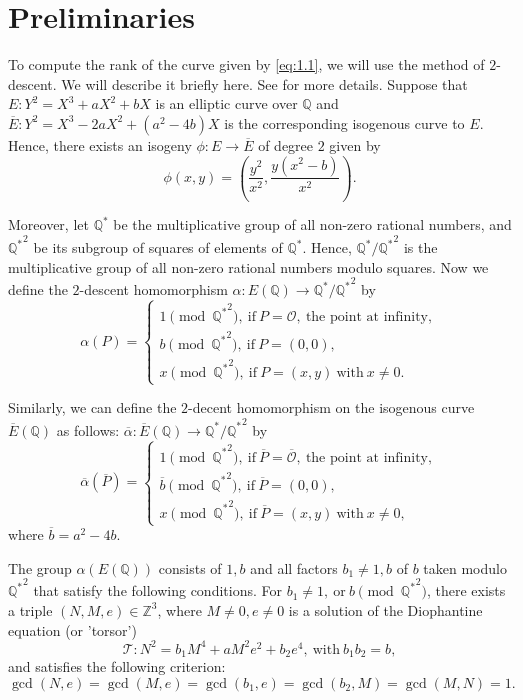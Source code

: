 \documentclass[12pt]{amsart}
\newcommand{\bbQ}{\mathbb{Q}}
\newcommand{\bbZ}{\mathbb{Z}}
\newcommand{\cO}{\mathcal{O}}
\newcommand{\cT}{\mathcal{T}}
\numberwithin{equation}{section}
\theoremstyle{definition}
\begin{document}
\section{Preliminaries}

To compute the rank of the curve given by \eqref{eq:1.1}, we will use the method
of $2$-descent. We will describe it briefly here. See \cite[Chapter~III, Sections~4--6]{ST15}
for more details. Suppose that $E: Y^{2}= X^{3} + aX^{2} + bX$ is an elliptic curve
over $\bbQ$ and $\overline{E}: Y^{2} = X^{3} - 2aX^{2} + \left( a^{2}- 4b \right)X$
is the corresponding isogenous curve to $E$. Hence, there exists an isogeny
$\phi: E \rightarrow \overline{E}$ of degree $2$ given by
\[
\phi(x,y) = \left( \frac{y^{2}}{x^{2}}, \frac{y(x^{2}-b)}{x^{2}} \right).
\]

Moreover, let $\bbQ^{*}$ be the multiplicative group of all non-zero rational numbers,
and ${\bbQ^{*}}^{2}$ be its subgroup of squares of elements of $\bbQ^{*}$. Hence,
$\bbQ^{*}/{\bbQ^{*}}^{2}$ is the multiplicative group of all non-zero rational
numbers modulo squares. Now we define the $2$-descent
homomorphism $\alpha: E(\bbQ) \rightarrow \bbQ^{*}/{\bbQ^{*}}^{2}$ by
\[
\alpha(P)= 
\begin{cases}
1 \pmod{{\bbQ^{*}}^{2}}, ~\text{if}~ P= \cO, ~\text{the point at infinity},\\
b \pmod{{\bbQ^{*}}^{2}}, ~\text{if}~ P= (0,0),\\
x \pmod{{\bbQ^{*}}^{2}}, ~\text{if}~ P= (x,y) ~\text{with}~ x \neq 0.
\end{cases}
\]

Similarly, we can define the $2$-decent homomorphism on the isogenous curve
$\overline{E}(\bbQ)$ as follows:
$\overline{\alpha}: \overline{E}(\bbQ) \rightarrow \bbQ^{*}/{\bbQ^{*}}^{2}$ by
\[
\overline{\alpha}(\overline{P})
=\begin{cases}
1 \pmod {{\bbQ^{*}}^{2}}, ~\text{if}~ \overline{P}= \overline{\cO}, ~\text{the point at infinity},\\
\overline{b} \pmod {{\bbQ^{*}}^{2}}, ~\text{if}~ \overline{P}= (0,0),\\
x \pmod {{\bbQ^{*}}^{2}}, ~\text{if}~ \overline{P}= (x,y) ~\text{with}~ x \neq 0,
\end{cases}
\]
where $\overline{b}= a^{2} - 4b$.

The group $\alpha(E(\bbQ))$ consists of $1,b$ and all factors $b_{1} \neq 1,b$
of $b$ taken modulo ${\bbQ^{*}}^{2}$ that satisfy the following conditions.
For $b_{1} \neq 1, ~\text{or}~ b \pmod {{\bbQ^{*}}^{2}}$,
there exists a triple $(N, M, e) \in \bbZ^{3}$, where $M \neq 0, e \neq 0$ is a
solution of the Diophantine equation (or 'torsor')
\[
\cT: N^{2} = b_{1}M^{4} + aM^{2}e^{2} + b_{2}e^{4}, ~\text{with}~  b_{1} b_{2} =b,
\]
and satisfies the following criterion:
\begin{equation}
\label{eq:gcd}
\gcd(N,e)=\gcd(M,e)=\gcd \left( b_{1}, e \right)=\gcd \left( b_{2}, M \right)
= \gcd(M,N)=1.
\end{equation}
\end{document}
